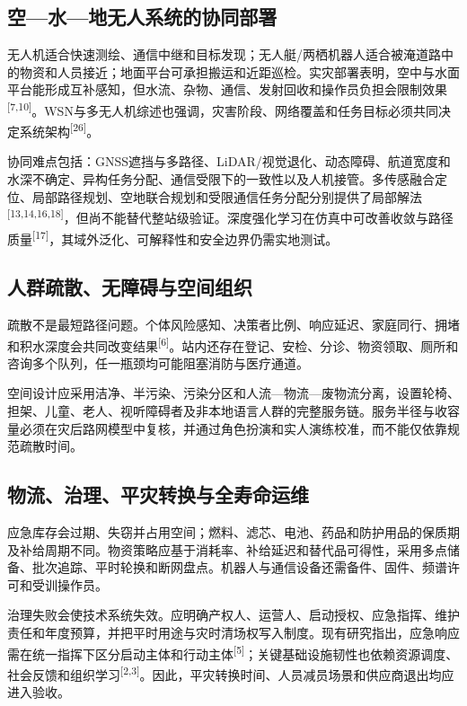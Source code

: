 \documentclass[UTF8,a4paper,zihao=-4]{ctexart}
\begin{document}
\subsection{空—水—地无人系统的协同部署}

无人机适合快速测绘、通信中继和目标发现；无人艇/两栖机器人适合被淹道路中的物资和人员接近；地面平台可承担搬运和近距巡检。实灾部署表明，空中与水面平台能形成互补感知，但水流、杂物、通信、发射回收和操作员负担会限制效果\textsuperscript{[7,10]}。WSN与多无人机综述也强调，灾害阶段、网络覆盖和任务目标必须共同决定系统架构\textsuperscript{[26]}。

协同难点包括：GNSS遮挡与多路径、LiDAR/视觉退化、动态障碍、航道宽度和水深不确定、异构任务分配、通信受限下的一致性以及人机接管。多传感融合定位、局部路径规划、空地联合规划和受限通信任务分配分别提供了局部解法\textsuperscript{[13,14,16,18]}，但尚不能替代整站级验证。深度强化学习在仿真中可改善收敛与路径质量\textsuperscript{[17]}，其域外泛化、可解释性和安全边界仍需实地测试。

\subsection{人群疏散、无障碍与空间组织}

疏散不是最短路径问题。个体风险感知、决策者比例、响应延迟、家庭同行、拥堵和积水深度会共同改变结果\textsuperscript{[6]}。站内还存在登记、安检、分诊、物资领取、厕所和咨询多个队列，任一瓶颈均可能阻塞消防与医疗通道。

空间设计应采用洁净、半污染、污染分区和人流—物流—废物流分离，设置轮椅、担架、儿童、老人、视听障碍者及非本地语言人群的完整服务链。服务半径与收容量必须在灾后路网模型中复核，并通过角色扮演和实人演练校准，而不能仅依靠规范疏散时间。

\subsection{物流、治理、平灾转换与全寿命运维}

应急库存会过期、失窃并占用空间；燃料、滤芯、电池、药品和防护用品的保质期及补给周期不同。物资策略应基于消耗率、补给延迟和替代品可得性，采用多点储备、批次追踪、平时轮换和断网盘点。机器人与通信设备还需备件、固件、频谱许可和受训操作员。

治理失败会使技术系统失效。应明确产权人、运营人、启动授权、应急指挥、维护责任和年度预算，并把平时用途与灾时清场权写入制度。现有研究指出，应急响应需在统一指挥下区分启动主体和行动主体\textsuperscript{[5]}；关键基础设施韧性也依赖资源调度、社会反馈和组织学习\textsuperscript{[2,3]}。因此，平灾转换时间、人员减员场景和供应商退出均应进入验收。
\end{document}
